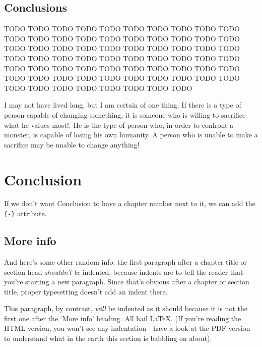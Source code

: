 \documentclass[a4paper, nobind]{templates/cdethesis}
\begin{document}
\hypertarget{conclusions}{%
\section{Conclusions}\label{conclusions}}

TODO TODO TODO TODO TODO TODO TODO TODO TODO TODO TODO TODO TODO TODO TODO TODO TODO TODO TODO TODO TODO TODO TODO TODO TODO TODO TODO TODO TODO TODO TODO TODO TODO TODO
TODO TODO TODO TODO TODO TODO TODO TODO TODO TODO TODO TODO TODO TODO TODO TODO TODO TODO TODO TODO TODO TODO TODO TODO TODO TODO TODO TODO TODO TODO TODO TODO TODO TODO

\begin{savequote}
I may not have lived long, but I am certain of one thing. If there is a
type of person capable of changing something, it is someone who is
willing to sacrifice what he values most!. He is the type of person who,
in order to confront a monster, is capable of losing his own humanity. A
person who is unable to make a sacrifice may be unable to change
anything!
\end{savequote}



\hypertarget{conclusion}{%
\chapter*{Conclusion}\label{conclusion}}

If we don't want Conclusion to have a chapter number next to it, we can add the \texttt{\{-\}} attribute.

\hypertarget{more-info}{%
\section*{More info}\label{more-info}}

And here's some other random info:
the first paragraph after a chapter title or section head \emph{shouldn't be} indented, because indents are to tell the reader that you're starting a new paragraph.
Since that's obvious after a chapter or section title, proper typesetting doesn't add an indent there.

This paragraph, by contrast, \emph{will} be indented as it should because it is not the first one after the `More info' heading.
All hail LaTeX. (If you're reading the HTML version, you won't see any indentation - have a look at the PDF version to understand what in the earth this section is babbling on about).
\end{document}
